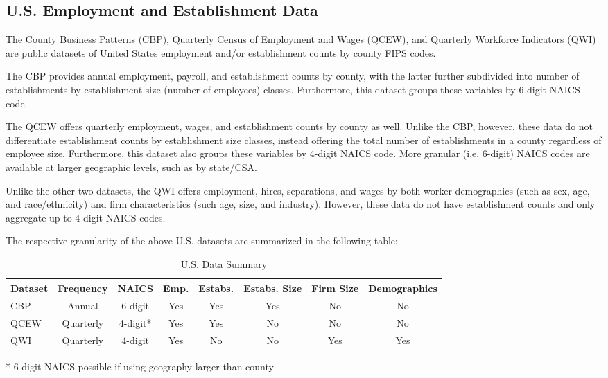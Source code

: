\subsection{U.S. Employment and Establishment Data}
The \href{https://www.census.gov/programs-surveys/cbp/data/datasets.html}{County Business Patterns} (CBP), \href{https://www.bls.gov/cew/downloadable-data-files.htm}{Quarterly Census of Employment and Wages} (QCEW), and \href{https://www.census.gov/data/developers/data-sets/qwi.html}{Quarterly Workforce Indicators} (QWI) are public datasets of United States employment and/or establishment counts by county FIPS codes.

The CBP provides annual employment, payroll, and establishment counts by county, with the latter further subdivided into number of establishments by establishment size (number of employees) classes.
Furthermore, this dataset groups these variables by 6-digit NAICS code.

The QCEW offers quarterly employment, wages, and establishment counts by county as well.
Unlike the CBP, however, these data do not differentiate establishment counts by establishment size classes, instead offering the total number of establishments in a county regardless of employee size.
Furthermore, this dataset also groups these variables by 4-digit NAICS code.
More granular (i.e. 6-digit) NAICS codes are available at larger geographic levels, such as by state/CSA.

Unlike the other two datasets, the QWI offers employment, hires, separations, and wages by both worker demographics (such as sex, age, and race/ethnicity) and firm characteristics (such age, size, and industry). 
However, these data do not have establishment counts and only aggregate up to 4-digit NAICS codes.

The respective granularity of the above U.S. datasets are summarized in the following table:
\begin{table}[H]
    \centering
    \caption{U.S. Data Summary}
    
    \begin{tabular}{l|c|c|c|c|c|c|c}
    \toprule
     Dataset & Frequency & NAICS & Emp. & Estabs. & Estabs. Size & Firm Size & Demographics \\
     \midrule
     CBP    & Annual & 6-digit & Yes & Yes & Yes & No & No \\
     QCEW   & Quarterly & 4-digit* & Yes & Yes & No & No & No \\ 
     QWI    & Quarterly & 4-digit & Yes & No & No & Yes & Yes \\
    \bottomrule
    \end{tabular}
    \begin{flushleft}
        \begin{footnotesize}
        * 6-digit NAICS possible if using geography larger than county
        \end{footnotesize}
    \end{flushleft}
\end{table}

